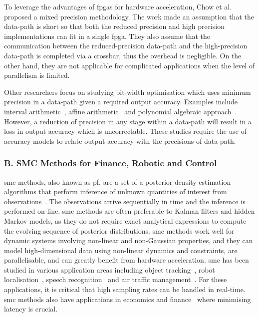 To leverage the advantages of \gls{fpga}s for hardware acceleration, Chow et al.~\cite{chow11} proposed a mixed precision methodology.
The work made an assumption that the data-path is short so that both the reduced precision and high precision implementations can fit in a single \gls{fpga}.
They also assume that the communication between the reduced-precision data-path and the high-precision data-path is completed via a crossbar, thus the overhead is negligible. 
On the other hand, they are not applicable for complicated applications when the level of parallelism is limited.

Other researchers focus on studying bit-width optimisation which uses minimum precision in a data-path given a required output accuracy.
Examples include interval arithmetic~\cite{fang03}, affine arithmetic~\cite{lee05,osborne07} and polynomial algebraic approach~\cite{boland10}.
However, a reduction of precision in any stage within a data-path will result in a loss in output accuracy which is uncorrectable.
These studies require the use of accuracy models to relate output accuracy with the precisions of data-path.

\subsubsection{B. SMC Methods for Finance, Robotic and Control}
\label{sec:smc}

\gls{smc} methods, also known as \gls{pf}, are a set of a posterior density estimation algorithms that perform inference of unknown quantities of interest from observations~\cite{doucet01}.
The observations arrive sequentially in time and the inference is performed on-line.
\gls{smc} methods are often preferable to Kalman filters and hidden Markov models, as they do not require exact analytical expressions to compute the evolving sequence of posterior distributions.
\gls{smc} methods work well for dynamic systems involving non-linear and non-Gaussian properties, and they can model high-dimensional data using non-linear dynamics and constraints, are parallelisable, and can greatly benefit from hardware acceleration.
\gls{smc} has been studied in various application areas including object tracking~\cite{happe11}, robot localisation~\cite{montemerlo02}, speech recognition~\cite{vermaak02} and air traffic management~\cite{kantas09,eele11}.
For these applications, it is critical that high sampling rates can be handled in real-time.
\gls{smc} methods also have applications in economics and finance~\cite{creal12} where minimising latency is crucial.

